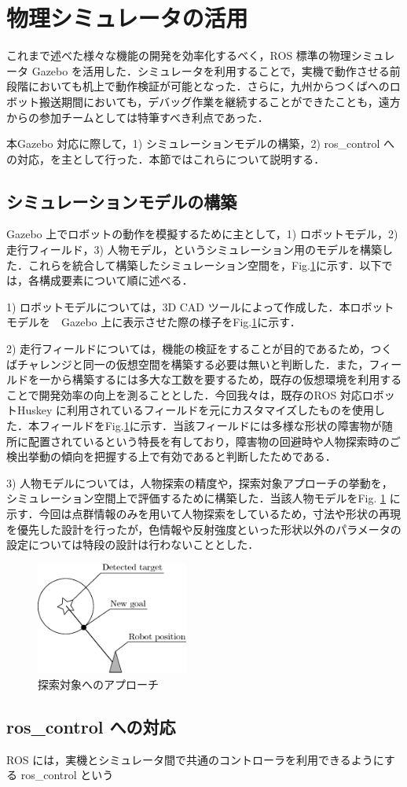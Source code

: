 \documentclass[10pt,a4paper]{jarticle}
\begin{document}
\section{物理シミュレータの活用}
\label{sec:simulation}

これまで述べた様々な機能の開発を効率化するべく，ROS 標準の物理シミュレータ Gazebo を活用した．シミュレータを利用することで，実機で動作させる前段階においても机上で動作検証が可能となった．さらに，九州からつくばへのロボット搬送期間においても，デバッグ作業を継続することができたことも，遠方からの参加チームとしては特筆すべき利点であった．

本Gazebo 対応に際して，1) シミュレーションモデルの構築，2) ros\_control への対応，を主として行った．本節ではこれらについて説明する．

\subsection{シミュレーションモデルの構築}
\label{subsec:simulationmodel}
Gazebo 上でロボットの動作を模擬するために主として，1) ロボットモデル，2) 走行フィールド，3) 人物モデル，というシミュレーション用のモデルを構築した．これらを統合して構築したシミュレーション空間を，Fig.\ref{142629_6Dec16}に示す．以下では，各構成要素について順に述べる．

1) ロボットモデルについては，3D CAD ツールによって作成した．本ロボットモデルを　Gazebo 上に表示させた際の様子をFig.\ref{142629_6Dec16}に示す．

2) 走行フィールドについては，機能の検証をすることが目的であるため，つくばチャレンジと同一の仮想空間を構築する必要は無いと判断した．また，フィールドを一から構築するには多大な工数を要するため，既存の仮想環境を利用することで開発効率の向上を測ることとした．今回我々は，既存のROS 対応ロボットHuskey に利用されているフィールドを元にカスタマイズしたものを使用した．本フィールドをFig.\ref{142629_6Dec16}に示す．当該フィールドには多様な形状の障害物が随所に配置されているという特長を有しており，障害物の回避時や人物探索時のご検出挙動の傾向を把握する上で有効であると判断したためである．

3) 人物モデルについては，人物探索の精度や，探索対象アプローチの挙動を，シミュレーション空間上で評価するために構築した．当該人物モデルをFig. \ref{142629_6Dec16} に示す．今回は点群情報のみを用いて人物探索をしているため，寸法や形状の再現を優先した設計を行ったが，色情報や反射強度といった形状以外のパラメータの設定については特段の設計は行わないこととした．

\begin{figure}[ht]
    \centering
    \includegraphics[width=5cm]{./fig/eps/approach_to_target.eps}
    \caption{探索対象へのアプローチ}
    \label{142629_6Dec16}
\end{figure}

\subsection{ros\_control への対応}
\label{subsec:ros_control}
ROS には，実機とシミュレータ間で共通のコントローラを利用できるようにする ros\_control という
\end{document}
